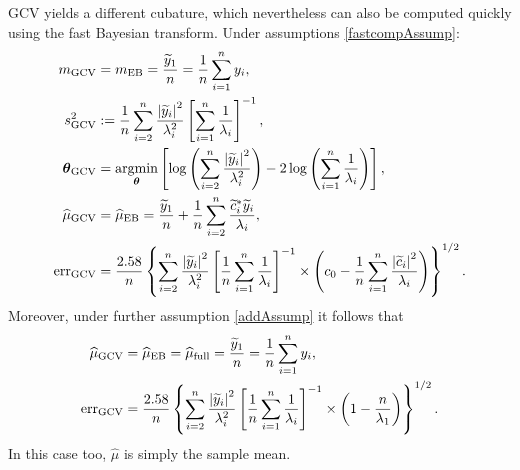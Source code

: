 \documentclass{iitthesis}          %
\newcommand{\bm}[1]{\boldsymbol{#1}}
\newcommand{\vtheta}{{\bm{\theta}}}
\newcommand{\hmu}{\widehat{\mu}}
\newcommand{\MLE}{\textup{EB}}
\newcommand{\GCV}{\textup{GCV}}
\newcommand{\err}{\textup{err}}
\def\abs#1{\ensuremath{\left \lvert #1 \right \rvert}}
\providecommand{\argmin}{\operatorname*{argmin}}
\begin{document}

GCV yields a different cubature, which nevertheless can also be computed quickly using the fast Bayesian transform.  Under assumptions \eqref{fastcompAssump}:
\begin{align}
\nonumber
m_{\textup{GCV}} & = m_\MLE =  \frac{\widetilde{y}_1}{n} = \frac 1n \sum_{i=1}^n y_i,\\
\nonumber 
s^2_{\textup{GCV}} & : =  \frac 1{n} \sum_{i=2}^n \frac{\abs{\widetilde{y}_i}^2}{\lambda_i^2}  \left [ \sum_{i=1}^n \frac{1}{\lambda_i} \right]^{-1}, \\
\label{eqn:thetaGCV_fast}
\vtheta_{\GCV} 
&= \argmin_\vtheta \left[ \log \left ( \sum_{i=2}^n \frac{\abs{\widetilde{y}_i}^2}{\lambda_i^2} 
\right) -2\log\left( \sum_{i=1}^n \frac{1}{\lambda_i} \right)
\right], \\
\nonumber
\hmu_{\GCV}
&= \hmu_\MLE  = \frac{\widetilde{y}_1}{n} +
\frac 1n \sum_{i=2}^n \frac{ \widetilde{c}_i^* \widetilde{y}_i}{\lambda_i}, \\
\nonumber
\err_{\textup{GCV}} & =
\frac{2.58}{n}\left\{\sum_{i=2}^n \frac{\abs{\widetilde{y}_i}^2}{\lambda_i^2}  \left [ \frac 1n \sum_{i=1}^n \frac{1}{\lambda_i} \right]^{-1}  \times
\left( c_0 - \frac 1n \sum_{i=1}^n \frac{\abs{\widetilde{c}_i}^2}{\lambda_i} \right) 
\right\}^{1/2}.
\end{align}
Moreover, under further assumption \eqref{addAssump} it follows that 
\begin{align*}
\nonumber %
\hmu_{\textup{GCV}}
&= \hmu_\MLE = \hmu_{\textup{full}} =
\frac{\widetilde{y}_1}{n} = \frac 1n \sum_{i=1}^n y_i,\\
\err_{\textup{GCV}} & =
\frac{2.58}{n}\left\{\sum_{i=2}^n \frac{\abs{\widetilde{y}_i}^2}{\lambda_i^2}  \left [ \frac 1n \sum_{i=1}^n \frac{1}{\lambda_i} \right]^{-1}  \times
\left( 1 -  \frac{n}{\lambda_1} \right)  
\right\}^{1/2}.
\end{align*}
In this case too, $\hmu$ is simply the sample mean.
\end{document}
